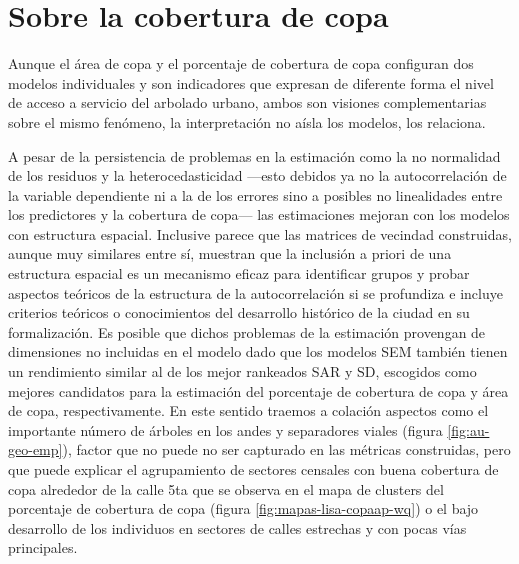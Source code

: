 \documentclass[12pt,]{book}
\begin{document}
\section{Sobre la cobertura de copa}\label{sobre-la-cobertura-de-copa}

Aunque el área de copa y el porcentaje de cobertura de copa configuran
dos modelos individuales y son indicadores que expresan de diferente
forma el nivel de acceso a servicio del arbolado urbano, ambos son
visiones complementarias sobre el mismo fenómeno, la interpretación no
aísla los modelos, los relaciona.

A pesar de la persistencia de problemas en la estimación como la no
normalidad de los residuos y la heterocedasticidad ---esto debidos ya no
la autocorrelación de la variable dependiente ni a la de los errores
sino a posibles no linealidades entre los predictores y la cobertura de
copa--- las estimaciones mejoran con los modelos con estructura
espacial. Inclusive parece que las matrices de vecindad construidas,
aunque muy similares entre sí, muestran que la inclusión a priori de una
estructura espacial es un mecanismo eficaz para identificar grupos y
probar aspectos teóricos de la estructura de la autocorrelación si se
profundiza e incluye criterios teóricos o conocimientos del desarrollo
histórico de la ciudad en su formalización. Es posible que dichos
problemas de la estimación provengan de dimensiones no incluidas en el
modelo dado que los modelos SEM también tienen un rendimiento similar al
de los mejor rankeados SAR y SD, escogidos como mejores candidatos para
la estimación del porcentaje de cobertura de copa y área de copa,
respectivamente. En este sentido traemos a colación aspectos como el
importante número de árboles en los andes y separadores viales (figura
\ref{fig:au-geo-emp}), factor que no puede no ser capturado en las
métricas construidas, pero que puede explicar el agrupamiento de
sectores censales con buena cobertura de copa alrededor de la calle 5ta
que se observa en el mapa de clusters del porcentaje de cobertura de
copa (figura \ref{fig:mapas-lisa-copaap-wq}) o el bajo desarrollo de los
individuos en sectores de calles estrechas y con pocas vías principales.
\end{document}
